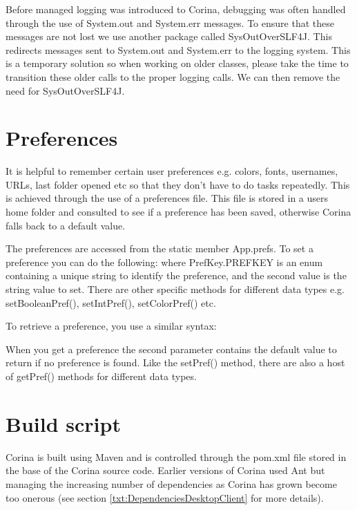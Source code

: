 Before managed logging was introduced to Corina, debugging was often handled through the use of System.out and System.err messages.  To ensure that these messages are not lost we use another package called SysOutOverSLF4J.  This redirects messages sent to System.out and System.err to the logging system.  This is a temporary solution so when working on older classes, please take the time to transition these older calls to the proper logging calls.  We can then remove the need for SysOutOverSLF4J.


\section{Preferences}
It is helpful to remember certain user preferences e.g. colors, fonts, usernames, URLs, last folder opened etc so that they don't have to do tasks repeatedly.  This is achieved through the use of a preferences file.  This file is stored in a users home folder and consulted to see if a preference has been saved, otherwise Corina falls back to a default value.  

The preferences are accessed from the static member App.prefs.  To set a preference you can do the following:
where PrefKey.PREFKEY is an enum containing a unique string to identify the preference, and the second value is the string value to set.  There are other specific methods for different data types e.g. setBooleanPref(), setIntPref(), setColorPref() etc.

To retrieve a preference, you use a similar syntax:

When you get a preference the second parameter contains the default value to return if no preference is found.  Like the setPref() method, there are also a host of getPref() methods for different data types.



\section{Build script}
\label{txt:buildScript}
Corina is built using Maven and is controlled through the pom.xml file stored in the base of the Corina source code.  Earlier versions of Corina used Ant but managing the increasing number of dependencies as Corina has grown become too onerous (see section \ref{txt:DependenciesDesktopClient} for more details). 

